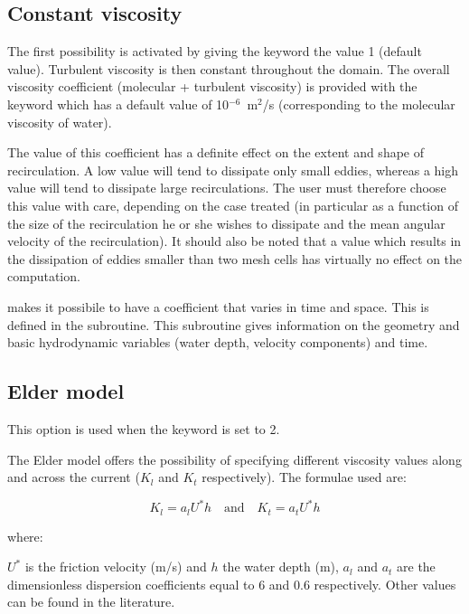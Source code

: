 \subsection{Constant viscosity}

The first possibility is activated by giving the keyword
 the value 1 (default value).
Turbulent viscosity is then constant throughout the domain.
The overall viscosity coefficient (molecular + turbulent viscosity) is provided
with the keyword  which has a default value of
10$^{-6}$~m$^2$/s (corresponding to the molecular viscosity of water).

The value of this coefficient has a definite effect on the extent and shape of
recirculation.
A low value will tend to dissipate only small eddies, whereas a high value will
tend to dissipate large recirculations.
The user must therefore choose this value with care, depending on the case
treated (in particular as a function of the size of the recirculation he or she
wishes to dissipate and the mean angular velocity of the recirculation).
It should also be noted that a value which results in the dissipation of eddies
smaller than two mesh cells has virtually no effect on the computation.

 makes it possibile to have a coefficient that varies in time and
space.
This is defined in the  subroutine.
This subroutine gives information on the geometry and basic hydrodynamic
variables (water depth, velocity components) and time.


\subsection{Elder model}

This option is used when the keyword  is set to 2.

The Elder model offers the possibility of specifying different viscosity values
along and across the current ($K_l$ and $K_t$ respectively).
The formulae used are:

\begin{equation}
  K_l = a_l U^* h  \textrm{~~~and~~~}  K_t = a_t U^* h
\end{equation}

where:

$U^*$ is the friction velocity (m/s) and $h$ the water depth (m),
$a_l$ and $a_t$ are the dimensionless dispersion coefficients equal to 6 and 0.6
respectively.
Other values can be found in the literature.

